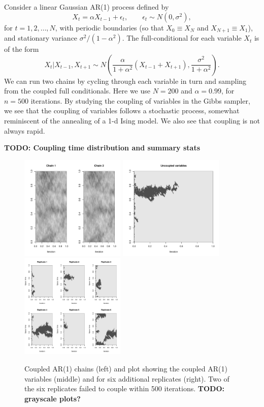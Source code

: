 \documentclass[11pt,a4paper]{article}
\begin{document}
Consider a linear Gaussian AR(1) process defined by
$$
X_t = \alpha X_{t-1} + \epsilon_t,\qquad \epsilon_t \sim N(0,\sigma^2),
$$
for $t=1,2,\ldots,N$, with periodic boundaries (so that $X_0\equiv X_N$ and $X_{N+1}\equiv X_1$), and stationary variance $\sigma^2/(1-\alpha^2)$. The full-conditional for each variable $X_t$ is of the form
$$
X_t|X_{t-1},X_{t+1} \sim N\left(\frac{\alpha}{1+\alpha^2}(X_{t-1}+X_{t+1}), \frac{\sigma^2}{1+\alpha^2} \right).
$$
We can run two chains by cycling through each variable in turn and sampling from the coupled full conditionals. Here we use $N=200$ and $\alpha=0.99$, for $n=500$ iterations. By studying the coupling of variables in the Gibbs sampler, we see that the coupling of variables follows a stochastic process, somewhat reminiscent of the annealing of a 1-d Ising model. We also see that coupling is not always rapid.

\textbf{TODO: Coupling time distribution and summary stats}

\begin{figure}
  \centerline{
    \includegraphics[height=5cm]{figs/coupled-chains}
    \qquad
    \includegraphics[height=5cm]{figs/uncoupled}
    \qquad
  \includegraphics[height=5cm]{figs/uncoupled6}
  }
\caption{Coupled AR(1) chains (left) and plot showing the coupled AR(1) variables (middle) and for six additional replicates (right). Two of the six replicates failed to couple within 500 iterations. \textbf{TODO: grayscale plots?}}
\end{figure}
\end{document}
